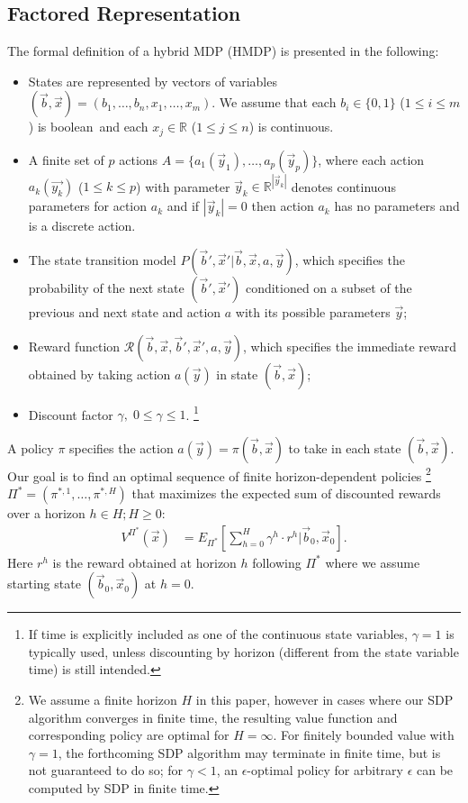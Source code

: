 \documentclass[twoside,11pt]{article}
\begin{document}
\subsection{Factored Representation}
\label{sec:HMDPs}
The formal definition of a hybrid MDP (HMDP) is presented in the following: 
\begin{itemize}
\item States are represented by vectors of variables $(\vec{b},\vec{x}) = ( b_1,\ldots,b_n,x_{1},\ldots,x_m )$.  We assume
that each $b_i \in \{ 0,1 \}$ ($1 \leq i \leq m$) is boolean$\,$ and each $x_j \in \mathbb{R}$ ($1 \leq j \leq
n$) is continuous.

\item A finite set of $p$ actions $A = \{a_{1}(\vec{y}_1), \ldots, a_{p}(\vec{y}_p)\}$, where each action $a_k(\vec{y_k})$ ($1
\leq k \leq p$)  with parameter $\vec{y}_k \in \mathbb{R}^{|\vec{y}_k|}$  denotes continuous parameters for 
action $a_{k}$ and  if $|\vec{y}_k|=0$ then action $a_{k}$ has no parameters and is a discrete action.

\item The state transition model $\mathit{P}(\vec{b}',\vec{x}'|\vec{b},\vec{x},a,\vec{y})$, which specifies the
probability of the next state $(\vec{b}',\vec{x}')$ conditioned on a
subset of the previous and next state and action $a$ with its possible parameters $\vec{y}$; 

\item Reward function $\mathcal{R}(\vec{b},\vec{x},\vec{b}',\vec{x}',a,\vec{y})$, which specifies the immediate reward obtained by taking action $a(\vec{y})$ in state $(\vec{b},\vec{x})$; 

\item Discount factor $\gamma, \; 0 \leq \gamma \leq 1$.
\footnote{If time is explicitly included as one of the
continuous state variables, $\gamma = 1$ is typically used, unless
discounting by horizon (different from the state variable time) is
still intended.}  
\end{itemize}

A policy $\pi$ specifies the action $a(\vec{y}) =\pi(\vec{b},\vec{x})$ to take in each state $(\vec{b},\vec{x})$.  Our
goal is to find an optimal sequence of finite horizon-dependent
policies
\footnote{We assume a finite horizon $H$ in this
paper, however in cases where our SDP algorithm converges
in finite time, the resulting value function and 
corresponding policy are optimal for $H=\infty$. 
For finitely bounded value
with $\gamma = 1$, the forthcoming SDP algorithm may terminate in
finite time, but is not guaranteed to do so; for $\gamma < 1$, an
$\epsilon$-optimal policy for arbitrary $\epsilon$ can be computed by
SDP in finite time.
} 
$\Pi^* = (\pi^{*,1},\ldots,\pi^{*,H})$ that
maximizes the expected sum of discounted rewards over a horizon $h \in H; H \geq 0$:
\begin{align}
V^{\Pi^*}(\vec{x}) & = E_{\Pi^*} \left[ \sum_{h=0}^{H} \gamma^h \cdot r^h \Big| \vec{b}_0,\vec{x}_0 \right]. \label{eq:vfun_def}
\end{align}
Here $r^h$ is the reward obtained at horizon $h$ following $\Pi^*$ where 
we assume starting state $(\vec{b}_0,\vec{x}_0)$ at $h=0$.
\end{document}
